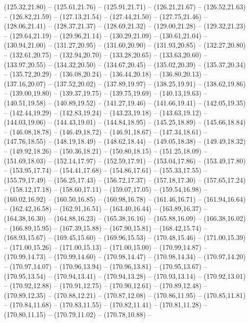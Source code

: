 {  (125.32,21.80) -- (125.61,21.76) -- (125.91,21.71) -- (126.21,21.67) -- (126.52,21.63) -- (126.82,21.59) -- (127.13,21.54) --
  (127.44,21.50) -- (127.75,21.46) -- (128.06,21.41) -- (128.37,21.37) -- (128.69,21.32) -- (129.00,21.28) -- (129.32,21.23) --
  (129.64,21.19) -- (129.96,21.14) -- (130.29,21.09) -- (130.61,21.04) -- (130.94,21.00) -- (131.27,20.95) -- (131.60,20.90) --
  (131.93,20.85) -- (132.27,20.80) -- (132.61,20.75) -- (132.94,20.70) -- (133.28,20.65) -- (133.63,20.60) -- (133.97,20.55) --
  (134.32,20.50) -- (134.67,20.45) -- (135.02,20.39) -- (135.37,20.34) -- (135.72,20.29) -- (136.08,20.24) -- (136.44,20.18) --
  (136.80,20.13) -- (137.16,20.07) -- (137.52,20.02) -- (137.89,19.97) -- (138.25,19.91) -- (138.62,19.86) -- (139.00,19.80) --
  (139.37,19.75) -- (139.75,19.69) -- (140.13,19.63) -- (140.51,19.58) -- (140.89,19.52) -- (141.27,19.46) -- (141.66,19.41) --
  (142.05,19.35) -- (142.44,19.29) -- (142.83,19.24) -- (143.23,19.18) -- (143.63,19.12) -- (144.03,19.06) -- (144.43,19.01) --
  (144.84,18.95) -- (145.25,18.89) -- (145.66,18.84) -- (146.08,18.78) -- (146.49,18.72) -- (146.91,18.67) -- (147.34,18.61) --
  (147.76,18.55) -- (148.19,18.49) -- (148.62,18.44) -- (149.05,18.38) -- (149.49,18.32) -- (149.92,18.26) -- (150.36,18.21) --
  (150.80,18.15) -- (151.25,18.09) -- (151.69,18.03) -- (152.14,17.97) -- (152.59,17.91) -- (153.04,17.86) -- (153.49,17.80) --
  (153.95,17.74) -- (154.41,17.68) -- (154.86,17.61) -- (155.33,17.55) -- (155.79,17.49) -- (156.25,17.43) -- (156.72,17.37) --
  (157.18,17.30) -- (157.65,17.24) -- (158.12,17.18) -- (158.60,17.11) -- (159.07,17.05) -- (159.54,16.98) -- (160.02,16.92) --
  (160.50,16.85) -- (160.98,16.78) -- (161.46,16.71) -- (161.94,16.64) -- (162.42,16.58) -- (162.91,16.51) -- (163.40,16.44) --
  (163.89,16.37) -- (164.38,16.30) -- (164.88,16.23) -- (165.38,16.16) -- (165.88,16.09) -- (166.38,16.02) -- (166.89,15.95) --
  (167.39,15.88) -- (167.90,15.81) -- (168.42,15.74) -- (168.93,15.67) -- (169.45,15.60) -- (169.96,15.53) -- (170.48,15.46) --
  (171.00,15.39) -- (171.00,15.26) -- (171.00,15.13) -- (171.00,15.00) -- (170.99,14.87) -- (170.99,14.73) -- (170.99,14.60) --
  (170.98,14.47) -- (170.98,14.34) -- (170.97,14.20) -- (170.97,14.07) -- (170.96,13.94) -- (170.96,13.81) -- (170.95,13.67) --
  (170.95,13.54) -- (170.94,13.41) -- (170.94,13.28) -- (170.93,13.14) -- (170.92,13.01) -- (170.92,12.88) -- (170.91,12.75) --
  (170.90,12.61) -- (170.89,12.48) -- (170.89,12.35) -- (170.88,12.21) -- (170.87,12.08) -- (170.86,11.95) -- (170.85,11.81) --
  (170.84,11.68) -- (170.83,11.55) -- (170.82,11.41) -- (170.81,11.28) -- (170.80,11.15) -- (170.79,11.02) -- (170.78,10.88) --
}
